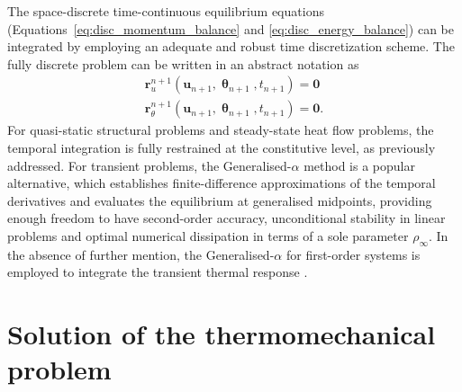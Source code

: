 The space-discrete time-continuous equilibrium equations (Equations~\eqref{eq:disc_momentum_balance} and \eqref{eq:disc_energy_balance}) can be integrated by employing an adequate and robust time discretization scheme.
The fully discrete problem can be written in an abstract notation as
\begin{gather}
  \mathbf{r}_{u}^{n+1}(\mathbf{u}_{n+1}, \bm{\uptheta}_{n+1}, t_{n+1})=\bm{0}\,\label{eq:mech_problem}\\
  \mathbf{r}_{\theta}^{n+1}(\mathbf{u}_{n+1}, \bm{\uptheta}_{n+1}, t_{n+1}) = \bm{0}. \label{eq:therm_problem}
\end{gather}
For quasi-static structural problems and steady-state heat flow problems, the temporal integration is fully restrained at the constitutive level, as previously addressed.
For transient problems, the Generalised-$\alpha$ method is a popular alternative, which establishes finite-difference approximations of the temporal derivatives and evaluates the equilibrium at generalised midpoints, providing enough freedom to have second-order accuracy, unconditional stability in linear problems and optimal numerical dissipation in terms of a sole parameter $\rho_{\infty}$.
In the absence of further mention, the Generalised-$\alpha$ for first-order systems is employed to integrate the transient thermal response \citep{jansen2000GeneralizedaMethodIntegrating}.

\section{Solution of the thermomechanical problem}

